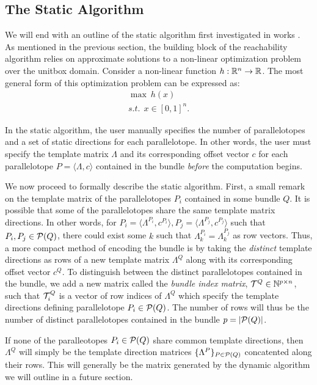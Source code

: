 \subsection{The Static Algorithm}
\label{sec:static}

We will end with an outline of the static algorithm first investigated in works \cite{dang2012reachability, dreossi2016parallelotope}. As mentioned in the previous section, the building block of the reachability algorithm relies on approximate solutions to a non-linear optimization problem over the unitbox domain. Consider a non-linear function $h : {\mathbb{R}}^n \rightarrow {\mathbb{R}}$. The most general form of this optimization problem can be expressed as:
%
\begin{eqnarray}
  \max ~ h(x) \label{eq:maxsup}\\
  s.t. ~~ x \in [0,1]^{n}.\nonumber
\end{eqnarray}

In the static algorithm, the user manually specifies the number of parallelotopes and a set of static directions for each parallelotope. In other words, the user must specify the template matrix $\Lambda$ and its corresponding offset vector $c$ for each parallelotope $P = \langle \Lambda, c\rangle$ contained in the bundle \emph{before} the computation begins.

We now proceed to formally describe the static algorithm.
%
First, a small remark on the template matrix of the parallelotopes $P_i$ contained in some bundle $Q$. It is possible that some of the parallelotopes share the same template matrix directions.
%
 In other words, for $P_i = \langle \Lambda^{P_i}, c^{P_i} \rangle, P_j = \langle \Lambda^{P_j}, c^{P_j} \rangle$ such that $P_i, P_j \in \mathcal{P}(Q)$, there could exist some $k$ such that $\Lambda^{P_i}_k = \Lambda^{P_j}_k$ as row vectors.
%
Thus, a more compact method of encoding the bundle is by taking the \emph{distinct} template directions as rows of a new template matrix $\Lambda^Q$ along with its corresponding offset vector $c^Q$.
%
To distinguish between the distinct parallelotopes contained in the bundle, we add a new matrix called the \emph{bundle index matrix}, $\mathcal{T}^Q \in \mathbb{N}^{p \times n}$, such that $\mathcal{T}^Q_i$ is a vector of row indices of $\Lambda^Q$ which specify the template directions defining parallelotope $P_i \in \mathcal{P}(Q)$.
%
The number of rows will thus be the number of distinct parallelotopes contained in the bundle $p = |\mathcal{P}(Q)|$.
%
\begin{remark}
If none of the paralleotopes $P_i \in \mathcal{P}(Q)$ share common template directions, then $\Lambda^Q$ will simply be the template direction matrices $\{\Lambda^P\}_{P \in \mathcal{P}(Q)}$ concatented along their rows. This will generally be the matrix generated by the dynamic algorithm we will outline in a future section.
\end{remark}
%
\begin{example}

\end{example}


